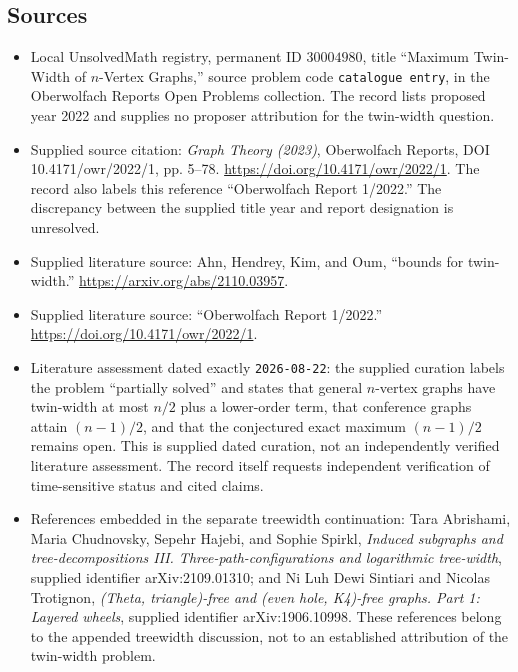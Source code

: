 \documentclass[11pt]{article}
\begin{document}
\subsection{Sources}
\begin{itemize}
\item Local UnsolvedMath registry, permanent ID \(30004980\), title ``Maximum Twin-Width of \(n\)-Vertex Graphs,'' source problem code \texttt{catalogue entry}, in the Oberwolfach Reports Open Problems collection. The record lists proposed year 2022 and supplies no proposer attribution for the twin-width question.
\item Supplied source citation: \emph{Graph Theory (2023)}, Oberwolfach Reports, DOI 10.4171/owr/2022/1, pp. 5--78. \url{https://doi.org/10.4171/owr/2022/1}. The record also labels this reference ``Oberwolfach Report 1/2022.'' The discrepancy between the supplied title year and report designation is unresolved.
\item Supplied literature source: Ahn, Hendrey, Kim, and Oum, ``bounds for twin-width.'' \url{https://arxiv.org/abs/2110.03957}.
\item Supplied literature source: ``Oberwolfach Report 1/2022.'' \url{https://doi.org/10.4171/owr/2022/1}.
\item Literature assessment dated exactly \texttt{2026-08-22}: the supplied curation labels the problem ``partially solved'' and states that general \(n\)-vertex graphs have twin-width at most \(n/2\) plus a lower-order term, that conference graphs attain \((n-1)/2\), and that the conjectured exact maximum \((n-1)/2\) remains open. This is supplied dated curation, not an independently verified literature assessment. The record itself requests independent verification of time-sensitive status and cited claims.
\item References embedded in the separate treewidth continuation: Tara Abrishami, Maria Chudnovsky, Sepehr Hajebi, and Sophie Spirkl, \emph{Induced subgraphs and tree-decompositions III. Three-path-configurations and logarithmic tree-width}, supplied identifier arXiv:2109.01310; and Ni Luh Dewi Sintiari and Nicolas Trotignon, \emph{(Theta, triangle)-free and (even hole, K4)-free graphs. Part 1: Layered wheels}, supplied identifier arXiv:1906.10998. These references belong to the appended treewidth discussion, not to an established attribution of the twin-width problem.
\end{itemize}
\end{document}
